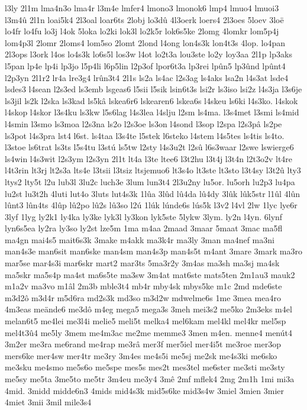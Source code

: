 {l3ly
2l1m
lma4n3o
lma4r
l3m4e
lmfer4
lmono3
lmonok6
lmp4
lmuo4
lmuoi3
l3m4û
2l1n
loai5k4
2l3oal
loar6ts
2lobj
lo3dû
4l3oerk
loers4
2l3oes
5loev
3loë
lo4fr
lo4fu
lo3j
l4ok
5loka
lo2ki
lok3l
lo2k5r
lok6s5ke
2lomg
4lomkr
lom5p4j
lom4p3l
2lomr
2loms4
lom5so
2lomt
2lond
l4ong
lon4s3k
lon4t3s
4lop.
lo4pan
2l3ops
l3ork
l4os
lo4s3k
lo6s5l
los3w
l4ot
lo2t3a
lou3ste
lo2y
loy3aa
2l1p
lp3aks
l5pan
lp4e
lp4i
lp3jo
l5p4li
l6p5lin
l2p3of
lpor6t3a
lp3rei
lpûn5
lp3ûnd
lpûnt4
l2p3yn
2l1r2
lr4a
lre3g4
lrûn3t4
2l1s
ls2a
ls4ac
l2s3ag
ls4aks
lsa2n
l4s3at
lsde4
lsdes3
l4sean
l2s3ed
ls3emb
lsgeas6
l5sii
l5sik
lsin6t3s
lsi2r
ls3iso
lsi2z
l4s3ja
l3s6je
ls3jil
ls2k
l2ska
ls3kad
ls5kâ
lskea6r6
lskearen6
lskea6s
l4skeu
ls6ki
l4s3ko.
l4skok
l4skop
l4skor
l3s4ku
ls3kw
l5s6lag
l4s3lea
l4slju
l2sm
ls4ma.
l3s4met
l3smi
ls4mid
l4smin
l3smo
ls3moa
l2s3na
ls2o
l2s3oe
ls3on
l4sond
l3sop
l2spa
l2s3pâ
ls2pe
ls3pot
l4s3pra
lst4
l6st.
ls4taa
l3s4te
l5stek
l6steko
l4stem
l4s5tes
ls4tis
ls4to.
l3stoe
ls6trat
ls3ts
l5s4tu
l3stú
ls5tw
l2sty
l4s3u2t
l2sû
l6s3waar
l2swe
lswierge6
ls4win
l4s3wit
l2s3ym
l2s3yn
2l1t
lt4a
l3te
ltee6
l3t2hu
l3t4j
l3t4n
l2t3o2v
lt4re
l4t3rin
lt3rj
lt2s3a
lts4e
l3tsii
l3tsiz
ltsjemuo6
lt3s4o
lt3ste
lt3sto
l3t4sy
l3t2û
lty3
ltys2
lty5t
l2u
lub3l
3lu2c
luch3e
3lum
lun3t4
2l3u2ny
lu5or.
lu5orh
lu2p3
lu4pa
lu2st
lu3t2h
4luti
lut4o
3luts
lut4s3k
1lûa
3lûd
lû4da
lû4dy
3lûk
lûk5str
l1ûl
4lûn
lûnt3
lûn4ts
4lûp
lû2po
lû2s
lû3so
l2ú
1lúk
lúnde6s
lús5k
l3v2
l4vl
2lw
1lyc
lye6r
3lyf
1lyg
ly2k1
ly4ka
ly3ke
lyk3l
ly3kon
lyk5ste
5lykw
3lym.
ly2n
l4yn.
6lynf
lyn6s5ea
ly2ra
ly3so
ly2st
lze5m
1ma
m4aa
2maad
3maar
5maat
3mac
ma5fl
ma4gn
mai4s5
mait6s3k
3make
m4akk
ma3k4r
ma3ly
3man
ma4nef
ma3ni
man4s3e
man6sit
man6ske
man4sm
man4s3p
man4s5t
m4ant
3mare
3mark
ma3ro
mar5se
mar4s3i
mar6skr
mart2
mar3ts
5ma3r2y
3m4as
ma3sh
ma3sj
ma4sk
ma5skr
ma5s4p
ma4st
ma6s5te
ma3sw
3m4at
mat6ste
mats5ten
2m1au3
mauk2
m1a2v
ma3vo
m1âl
2m3b
mble3t4
mb4r
mby4sk
mbys5ke
m1c
2md
mde6ste
m3d2ô
m3d4r
m5d6ra
md2s3k
md3so
m3d2w
mdwelme6s
1me
3mea
mea4ro
4m3eas
meände6
me3dô
m4eg
mega5
mega3s
3meh
mei3s2
me5ko
2m3eks
m4el
melan6t5
me4lei
me3l4i
melie5
meli5t
melka4
mel6kam
mel4kl
mel4kr
mel5sp
mel4t3û4
me5ly
3mem
me4m3ac
me2me
memme3
3men
m4en.
menne4
menút4
3m2er
me3ra
me6rand
me4rap
me3râ
mer3f
mer5iel
mer4i5t
me3roe
mer3op
mers6ke
mer4sw
mer4tr
me3ry
3m4es
me4s5i
me5sj
me2sk
me4s3ki
me6sko
me3sku
me4smo
me5s6o
me5spe
mes5s
mes2t
mes3tel
me6ster
me3sti
me3sty
me5sy
me5ta
3me5to
me5tr
3m4eu
me3y4
3mê
2mf
mflek4
2mg
2m1h
1mi
mi3a
4mid.
3midd
midde6n3
4mids
mid4s3k
mid5s6ke
mid3s4w
3miel
3mien
3mier
4miet
3mii
3mil
mile3s4
}
